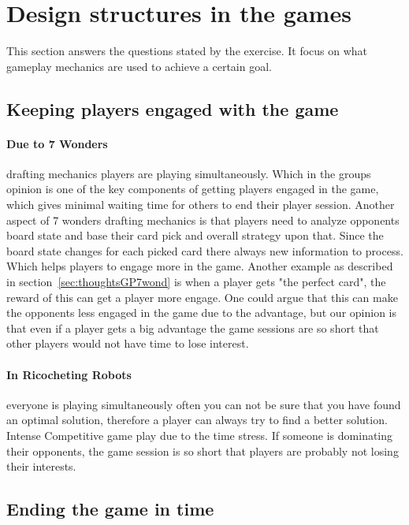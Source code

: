 \documentclass[a4paper]{article}
\begin{document}
\section{Design structures in the games}
This section answers the questions stated by the exercise. It focus on what gameplay mechanics are used to achieve a certain goal. 

\subsection{Keeping players engaged with the game}
\paragraph{Due to 7 Wonders} drafting mechanics players are playing simultaneously. Which in the groups opinion is one of the key components of getting players engaged in the game, which gives minimal waiting time for others to end their player session. Another aspect of 7 wonders drafting mechanics is that players need to analyze opponents board state and base their card pick and overall strategy upon that. Since the board state changes for each picked card there always new information to process. Which helps players to engage more in the game.
Another example as described in section~\ref{sec:thoughtsGP7wond} is when a player gets "the perfect card", the reward of this can get a player more engage. One could argue that this can make the opponents less engaged in the game due to the advantage, but our opinion is that even if a player gets a big advantage the game sessions are so short that other players would not have time to lose interest.  


\paragraph{In Ricocheting Robots} everyone is playing simultaneously often you can not be sure that you have found an optimal solution, therefore a player can always try to find a better solution. Intense Competitive game play due to the time stress. If someone is dominating their opponents, the game session is so short that players are probably not losing their interests.


\subsection{Ending the game in time}
\end{document}
